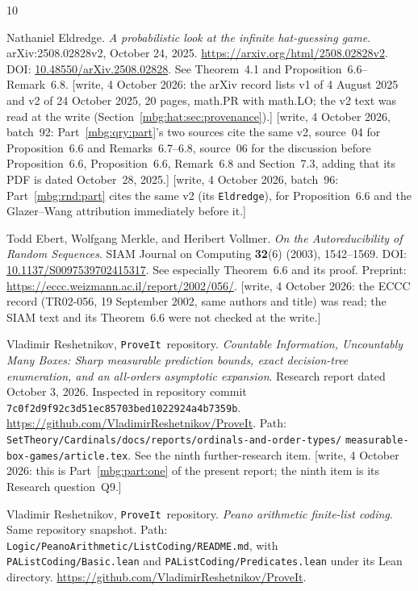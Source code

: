 \documentclass[11pt,letterpaper]{article}
\theoremstyle{definition}
\newcommand{\repo}{\texttt{ProveIt}}
\begin{document}
\begin{thebibliography}{10}
\raggedright
{}
Nathaniel Eldredge.
\emph{A probabilistic look at the infinite hat-guessing game}.
arXiv:2508.02828v2, October 24, 2025.
\url{https://arxiv.org/html/2508.02828v2}.
DOI: \href{https://doi.org/10.48550/arXiv.2508.02828}
{10.48550/arXiv.2508.02828}.
See Theorem~4.1 and Proposition~6.6--Remark~6.8.
{\small[write, 4 October 2026: the arXiv record lists v1 of 4 August 2025 and v2 of 24 October 2025, 20 pages, math.PR with math.LO; the v2 text was read at the write (Section~\ref{mbg:hat:sec:provenance}).]}
{\small[write, 4 October 2026, batch~92: Part~\ref{mbg:qry:part}'s two sources cite the same v2, source~04 for Proposition~6.6 and Remarks~6.7--6.8, source~06 for the discussion before Proposition~6.6, Proposition~6.6, Remark~6.8 and Section~7.3, adding that its PDF is dated October~28, 2025.]}
{\small[write, 4 October 2026, batch~96: Part~\ref{mbg:rnd:part} cites the same v2 (its \texttt{Eldredge}), for Proposition~6.6 and the Glazer--Wang attribution immediately before it.]}

Todd Ebert, Wolfgang Merkle, and Heribert Vollmer.
\emph{On the Autoreducibility of Random Sequences}.
SIAM Journal on Computing \textbf{32}(6) (2003), 1542--1569.
DOI: \href{https://doi.org/10.1137/S0097539702415317}
{10.1137/S0097539702415317}.
See especially Theorem~6.6 and its proof.
Preprint: \url{https://eccc.weizmann.ac.il/report/2002/056/}.
{\small[write, 4 October 2026: the ECCC record (TR02-056, 19 September 2002, same authors and title) was read; the SIAM text and its Theorem~6.6 were not checked at the write.]}

Vladimir Reshetnikov, \repo\ repository.
\emph{Countable Information, Uncountably Many Boxes:
Sharp measurable prediction bounds, exact decision-tree
enumeration, and an all-orders asymptotic expansion}.
Research report dated October 3, 2026.
Inspected in repository commit
\texttt{7c0f2d9f92c3d51ec85703bed1022924a4b7359b}.
\url{https://github.com/VladimirReshetnikov/ProveIt}.
Path:
\texttt{SetTheory/Cardinals/docs/reports/ordinals-and-order-types/}
\texttt{measurable-box-games/article.tex}.
See the ninth further-research item.
{\small[write, 4 October 2026: this is Part~\ref{mbg:part:one} of the present report; the ninth item is its Research question~Q9.]}

Vladimir Reshetnikov, \repo\ repository.
\emph{Peano arithmetic finite-list coding}.
Same repository snapshot.
Path: \texttt{Logic/PeanoArithmetic/ListCoding/README.md},
with \texttt{PAListCoding/Basic.lean} and
\texttt{PAListCoding/Predicates.lean} under its Lean directory.
\url{https://github.com/VladimirReshetnikov/ProveIt}.


\end{thebibliography}
\end{document}
